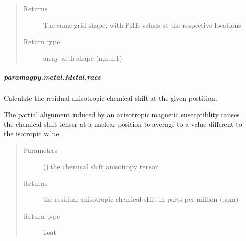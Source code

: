 \documentclass[a4paper,10pt,english,openany,oneside]{sphinxmanual}
\begin{document}
\begin{fulllineitems}
\begin{fulllineitems}
\begin{fulllineitems}
\begin{quote}
\begin{description}
\begin{itemize}
\end{itemize}

\item[{Returns}] \leavevmode
{} \textendash{} The same grid shape, with PRE values at the respective locations

\item[{Return type}] \leavevmode
array with shape (n,n,n,1)

\end{description}\end{quote}

\end{fulllineitems}



\subparagraph{paramagpy.metal.Metal.racs}
\label{\detokenize{reference/generated/paramagpy.metal.Metal.racs:paramagpy-metal-metal-racs}}\label{\detokenize{reference/generated/paramagpy.metal.Metal.racs::doc}}

\begin{fulllineitems}
\label{\detokenize{reference/generated/paramagpy.metal.Metal.racs:paramagpy.metal.Metal.racs}}
Calculate the residual anisotropic chemical shift at the
given postition.

The partial alignment induced by an anisotropic
magnetic susecptiblity causes the chemical shift tensor at a nuclear
position to average to a value different to the isotropic value.
\begin{quote}\begin{description}
\item[{Parameters}] \leavevmode
{} () \textendash{} the chemical shift anisotropy tensor

\item[{Returns}] \leavevmode
{} \textendash{} the residual anisotropic chemical shift in parts-per-million (ppm)

\item[{Return type}] \leavevmode
float

\end{description}\end{quote}

\end{fulllineitems}




\end{fulllineitems}
\end{fulllineitems}
\end{document}
